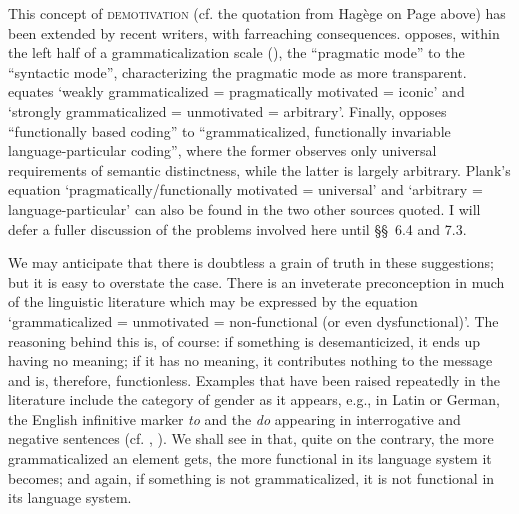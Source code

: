 \label{page140}This concept of \textsc{demotivation} (cf. the quotation from Hagège on Page \pageref{Hagege} above) has been extended by recent writers, with farreaching consequences. \citet[208--233]{Givón1979b} opposes, within the left half of a grammaticalization scale (), the “pragmatic mode” to the “syntactic mode”, characterizing the pragmatic mode as more transparent.\label{page141b} \citet[170--172]{Vincent1980a} equates ‘weakly grammaticalized = pragmatically motivated = iconic’ and ‘strongly grammaticalized = unmotivated = arbitrary’. Finally, \citet[622]{Plank1979b} opposes “functionally based coding” to “grammaticalized, functionally invariable language-particular coding”, where the former observes only universal requirements of semantic distinctness, while the latter is largely arbitrary. Plank's equation ‘pragmatically/functionally motivated = universal’ and ‘arbitrary = language-particular’ can also be found in the two other sources quoted. I will defer a fuller discussion of the problems involved here until §§~6.4 and 7.3.\label{page141}

We may anticipate that there is doubtless a grain of truth in these suggestions; but it is easy to overstate the case. There is an inveterate preconception in much of the linguistic literature which may be expressed by the equation ‘grammaticalized = unmotivated = non-functional (or even dysfunctional)’. The reasoning behind this is, of course: if something is desemanticized, it ends up having no meaning; if it has no meaning, it contributes nothing to the message and is, therefore, functionless. Examples that have been raised repeatedly in the literature include the category of gender as it appears, e.g., in Latin or German, the English infinitive marker \textit{to} and the \textit{do} appearing in interrogative and negative sentences (cf. \citealt[97f]{Sapir1921} , \citet[421]{Lyons1968}). We shall see in  that, quite on the contrary, the more grammaticalized an element gets, the more functional in its language system it becomes; and again, if something is not grammaticalized, it is not functional in its language system.

